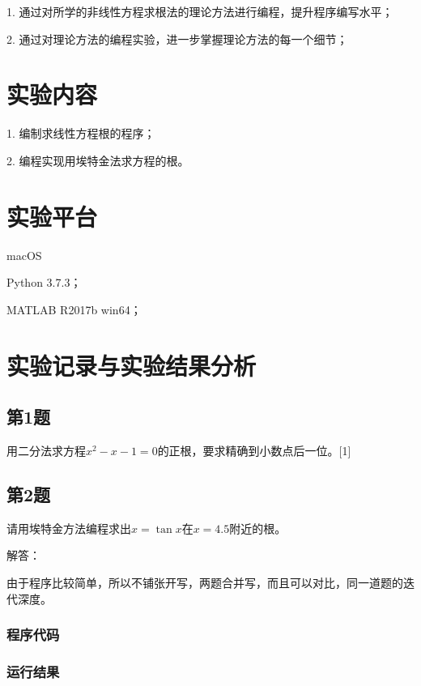 1. 通过对所学的非线性方程求根法的理论方法进行编程，提升程序编写水平；

2. 通过对理论方法的编程实验，进一步掌握理论方法的每一个细节；

\section{实验内容}

1. 编制求线性方程根的程序；

2. 编程实现用埃特金法求方程的根。

\section{实验平台}

macOS

Python 3.7.3；

MATLAB R2017b win64；

\section{实验记录与实验结果分析}

\subsection{第1题}

用二分法求方程$x^2-x-1=0$的正根，要求精确到小数点后一位。[1]

\subsection{第2题}

请用埃特金方法编程求出$x=\tan⁡x$在$x=4.5$附近的根。

解答：

由于程序比较简单，所以不铺张开写，两题合并写，而且可以对比，同一道题的迭代深度。
\subsubsection{程序代码}



\subsubsection{运行结果}


